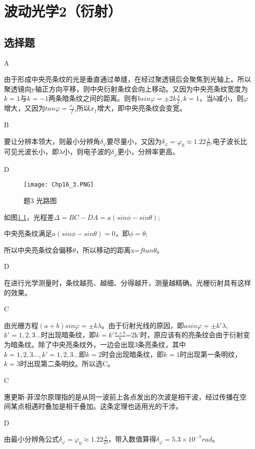 \chapter{波动光学2（衍射）}
\section{选择题}
\exercise A

\solve
由于形成中央亮条纹的光是垂直通过单缝，在经过聚透镜后会聚焦到光轴上。所以聚透镜向y轴正方向平移，则中央衍射条纹会向上移动。又因为中央亮条纹宽度为$k=1$与$k=-1$两条暗条纹之间的距离。则有$bsin\varphi=\pm2k\frac{\lambda}{2},k=1$，当$b$减小，则$\varphi$增大，又因为$tan\varphi=\frac{x_1}{f}$,所以$x_1$增大，即中央亮条纹会变宽。

\exercise B

\solve
要让分辨本领大，则最小分辨角$\delta_\varphi$要尽量小，又因为$\delta_\varphi=\varphi_0\approx1.22\frac{\lambda}{D}$,电子波长比可见光波长小，即$\lambda$小，则电子波的$\delta_\varphi$更小，分辨率更高。

\exercise D

\solve
\begin{figure}[htbp]
\centering
\texttt{[image: Chp16\_3.PNG]}
\caption{题3 光路图}\label{fig:16_3}
\end{figure}
如图\ref{fig:16_3}，光程差$\Delta=BC-DA=a(sin\phi-sin\theta)$;

中央亮条纹满足$a(sin\phi-sin\theta)=0$，即$\phi=\theta$;

所以中央亮条纹会偏移$\theta$，所以移动的距离x=$ftan\theta$。

\exercise D

\solve
在进行光学测量时，条纹越亮、越细、分得越开，测量越精确。光栅衍射具有这样的效果。

\exercise C

\solve
由光栅方程$(a+b)sin\varphi=\pm k\lambda$。由于衍射光线的原因，即$asin\varphi=\pm k'\lambda$,$k'=1,2,3...$时出现暗条纹，即$k=k'\frac{a+b}{a}$=2k'时，原应该有的亮条纹会由于衍射变为暗条纹。除了中央亮条纹外，一边会出现3条亮条纹，其中$k=1,2,3...,k'=1,2,3...$即$k=2$时会出现暗条纹，即$k=1$时出现第一条明纹，$k=3$时出现第二条明纹。所以选C。

\exercise C

\solve
惠更斯-菲涅尔原理指的是从同一波前上各点发出的次波是相干波，经过传播在空间某点相遇时叠加是相干叠加。这条定理也适用光的干涉。

\exercise D

\solve
由最小分辨角公式$\delta_\varphi=\varphi_0\approx1.22\frac{\lambda}{D}$，带入数值算得$\delta_\varphi=5.3\times10^{-7}rad$。

